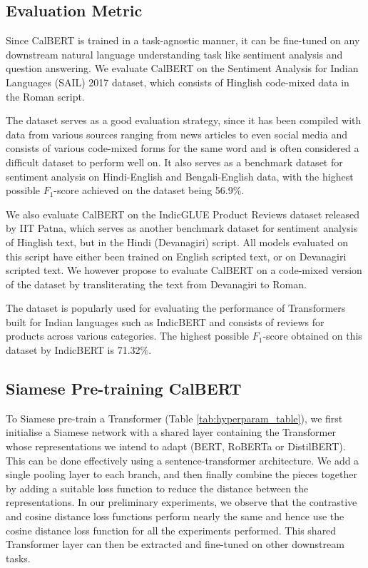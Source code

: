 \documentclass[conference]{IEEEtran}
\begin{document}
\subsection{Evaluation Metric}
Since CalBERT is trained in a task-agnostic manner, it can be fine-tuned on any downstream natural language understanding task like sentiment analysis and question answering. We evaluate CalBERT on the Sentiment Analysis for Indian Languages (SAIL) 2017 dataset, which consists of Hinglish code-mixed data in the Roman script. 

The dataset serves as a good evaluation strategy, since it has been compiled with data from various sources ranging from news articles to even social media and consists of various code-mixed forms for the same word and is often considered a difficult dataset to perform well on. It also serves as a benchmark dataset for sentiment analysis on Hindi-English and Bengali-English data, with the highest possible $F_1$-score achieved on the dataset being 56.9\%.

We also evaluate CalBERT on the IndicGLUE Product Reviews dataset released by IIT Patna, which serves as another benchmark dataset for sentiment analysis of Hinglish text, but in the Hindi (Devanagiri) script. All models evaluated on this script have either been trained on English scripted text, or on Devanagiri scripted text. We however propose to evaluate CalBERT on a code-mixed version of the dataset by transliterating the text from Devanagiri to Roman.

The dataset is popularly used for evaluating the performance of Transformers built for Indian languages such as IndicBERT and consists of reviews for products across various categories. The highest possible $F_1$-score obtained on this dataset by IndicBERT is 71.32\%.

\subsection{Siamese Pre-training CalBERT}
To Siamese pre-train a Transformer (Table \ref{tab:hyperparam_table}), we first initialise a Siamese network with a shared layer containing the Transformer whose representations we intend to adapt (BERT, RoBERTa or DistilBERT). This can be done effectively using a sentence-transformer architecture. We add a single pooling layer to each branch, and then finally combine the pieces together by adding a suitable loss function to reduce the distance between the representations. In our preliminary experiments, we observe that the contrastive and cosine distance loss functions perform nearly the same and hence use the cosine distance loss function for all the experiments performed. This shared Transformer layer can then be extracted and fine-tuned on other downstream tasks.
 
\end{document}
